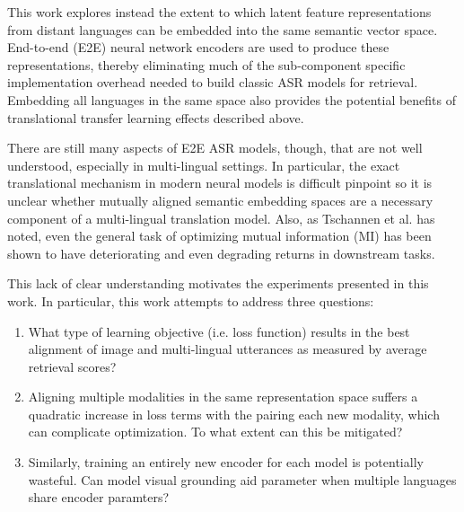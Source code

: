 This work explores instead the extent to which latent feature representations from distant languages can be embedded into the same semantic vector space.
End-to-end (E2E) neural network encoders are used to produce these representations, thereby eliminating much of the sub-component specific implementation overhead needed to build classic ASR models for retrieval.
Embedding all languages in the same space also provides the potential benefits of translational transfer learning effects described above.

There are still many aspects of E2E ASR models, though, that are not well understood, especially in multi-lingual settings.
In particular, the exact translational mechanism in modern neural models is difficult pinpoint so it is unclear whether mutually aligned semantic embedding spaces are a necessary component of a multi-lingual translation model.
Also, as Tschannen et al. \cite{tschannen2019mutual} has noted, even the general task of optimizing mutual information (MI) has been shown to have deteriorating and even degrading returns in downstream tasks.

This lack of clear understanding motivates the experiments presented in this work.
In particular, this work attempts to address three questions:



\begin{enumerate}
    \item What type of learning objective (i.e. loss function) results in the best alignment of image and multi-lingual utterances as measured by average retrieval scores?
    \item Aligning multiple modalities in the same representation space suffers a quadratic increase in loss terms with the pairing each new modality, which can complicate optimization.
To what extent can this be mitigated?

\item Similarly, training an entirely new encoder for each model is potentially wasteful.
    Can model visual grounding aid parameter when multiple languages share encoder paramters?
\end{enumerate}

